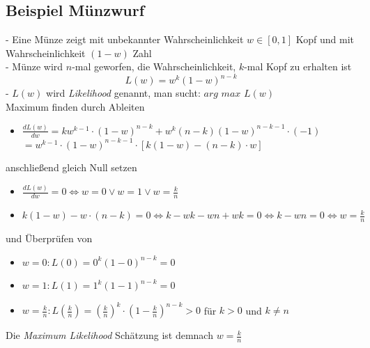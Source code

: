 \documentclass{report}
\begin{document}
  \subsection{Beispiel Münzwurf}	
  - Eine Münze zeigt mit unbekannter Wahrscheinlichkeit $w \in [0, 1]$ Kopf und mit Wahrscheinlichkeit $(1 - w)$ Zahl\\	
  - Münze wird $n$-mal geworfen, die Wahrscheinlichkeit, $k$-mal Kopf zu erhalten ist\\	
  $$L(w) = w^k(1 - w)^{n-k}$$	
  - $L(w)$ wird \textit{Likelihood} genannt, man sucht: $arg$ $max$ $L(w)$\\	
  Maximum finden durch Ableiten\\	
  \vspace*{-1.25em}	
  \begin{itemize}	
    \item $\frac{dL(w)}{dw} = kw^{k-1}\cdot(1 - w)^{n-k} + w^k(n-k)(1-w)^{n-k-1}\cdot(-1)$\\	
    $ = w^{k-1}\cdot (1-w)^{n-k-1}\cdot[k(1-w)-(n-k)\cdot w]$	
  \end{itemize}	
  anschließend gleich Null setzen\\	
  \vspace*{-1.25em}	
  \begin{itemize}	
    \item $\frac{dL(w)}{dw} = 0 \Leftrightarrow w = 0 \lor w = 1 \lor w = \frac{k}{n}$	
    \item $k(1-w) - w\cdot(n - k) = 0 \Leftrightarrow k -wk - wn + wk = 0 \Leftrightarrow k - wn = 0 \Leftrightarrow w = \frac{k}{n}$	
  \end{itemize}	
  und Überprüfen von\\	
  \vspace*{-1.25em}	
  \begin{itemize}	
    \item $w = 0: L(0) = 0^k(1 - 0)^{n-k} = 0$	
    \item $w = 1: L(1) = 1^k(1 - 1)^{n-k} = 0$	
    \item $w = \frac{k}{n}: L(\frac{k}{n}) = (\frac{k}{n})^k\cdot (1 - \frac{k}{n})^{n-k} > 0$ für $k > 0$ und $k \neq n$	
  \end{itemize}	
  Die \textit{Maximum Likelihood} Schätzung ist demnach $w = \frac{k}{n}$	
  
\end{document}

